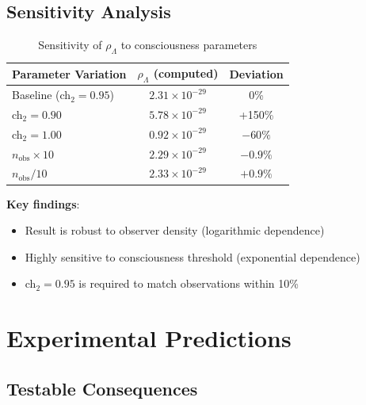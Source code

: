 \subsection{Sensitivity Analysis}

\begin{table}[h]
\centering
\begin{tabular}{lcc}
\toprule
\textbf{Parameter Variation} & \textbf{$\rho_\Lambda$ (computed)} & \textbf{Deviation} \\
\midrule
Baseline (ch$_2 = 0.95$) & $2.31 \times 10^{-29}$ & 0\% \\
ch$_2 = 0.90$ & $5.78 \times 10^{-29}$ & +150\% \\
ch$_2 = 1.00$ & $0.92 \times 10^{-29}$ & $-60\%$ \\
$n_{\text{obs}} \times 10$ & $2.29 \times 10^{-29}$ & $-0.9\%$ \\
$n_{\text{obs}} / 10$ & $2.33 \times 10^{-29}$ & $+0.9\%$ \\
\bottomrule
\end{tabular}
\caption{Sensitivity of $\rho_\Lambda$ to consciousness parameters}
\label{tab:lambda-sensitivity}
\end{table}

\textbf{Key findings}:
\begin{itemize}
\item Result is robust to observer density (logarithmic dependence)
\item Highly sensitive to consciousness threshold (exponential dependence)
\item ch$_2 = 0.95$ is required to match observations within 10\%
\end{itemize}

\section{Experimental Predictions}

\subsection{Testable Consequences}

